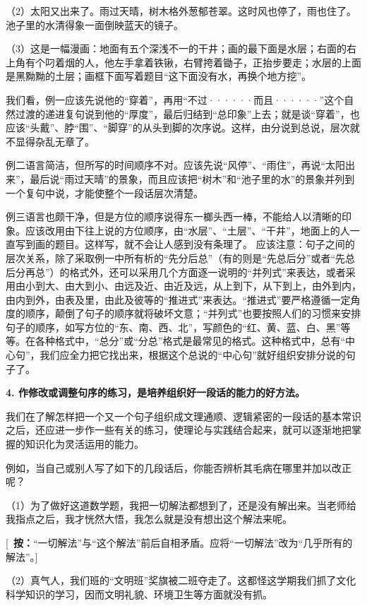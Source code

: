 （2）太阳又出来了。雨过天晴，树木格外葱郁苍翠。这时风也停了，雨也住了。池子里的水清得象一面倒映蓝天的镜子。

（3）这是一幅漫画：地面有五个深浅不一的干井；画的最下面是水层；右面的右上角有个叼着烟的人，他左手拿着铁锹，右臂挎着锄子，正抬步要走；水层的上面是黑黝黝的土层；画框下面写着题目“这下面没有水，再换个地方挖”。

我们看，例一应该先说他的“穿着”，再用“不过······而且······”这个自然过渡的递进复句说到他的“厚度”，最后归结到“总印象”上去；就是谈“穿着”，也应该“头戴”、脖“围”、“脚穿”的从头到脚的次序说。这样，由分说到总说，层次就不显得杂乱无章了。

例二语言简洁，但所写的时间顺序不对。应该先说“风停”、“雨住”，再说“太阳出来”，最后说“雨过天晴”的景象，而且应该把“树木”和“池子里的水”的景象并列到一个复句中说，才能使整个一段话层次清楚。

例三语言也颇干净，但是方位的顺序说得东一榔头西一棒，不能给人以清晰的印象。应该改用由下往上说的方位顺序，由“水层”、“土层”、“干井”，地面上的人一直写到画的题目。这样写，就不会让人感到没有条理了。
应该注意：句子之间的层次关系，除了采取例一中所有析的“先分后总”（有的则是“先总后分”或者“先总后分再总”）的格式外，还可以采用几个方面逐一说明的“并列式”来表达，或者采用由小到大、由大到小、由远及近、由近及远，从上到下，从下到上，由外到内，由内到外，由表及里，由此及彼等的“推进式”来表达。“推进式”要严格遵循一定角度的顺序，颠倒了句子的顺序就将破坏文意；“并列式”也要按照人们的习惯来安排句子的顺序，如写方位的“东、南、西、北”，写颜色的“红、黄、蓝、白、黑”等等。在各种格式中，“总分”或“分总”格式是最常见的格式。这种格式中，总有“中心句”，我们应全力把它找出来，根据这个总说的“中心句”就好组织安排分说的句子了。

\textbf{4. 作修改或调整句序的练习，是培养组织好一段话的能力的好方法。}

我们在了解怎样把一个又一个句子组织成文理通顺、逻辑紧密的一段话的基本常识之后，还应进一步作一些有关的练习，使理论与实践结合起来，就可以逐渐地把掌握的知识化为灵活运用的能力。

例如，当自己或别人写了如下的几段话后，你能否辨析其毛病在哪里并加以改正呢？

（1）为了做好这道数学题，我把一切解法都想到了，还是没有解出来。当老师给我指点之后，我才恍然大悟，我怎么就是没有想出这个解法来呢。

[\ \textbf{按：}“一切解法”与“这个解法”前后自相矛盾。应将“一切解法”改为“几乎所有的解法”。]

（2）真气人，我们班的“文明班”奖旗被二班夺走了。这都怪这学期我们抓了文化科学知识的学习，因而文明礼貌、环境卫生等方面就没有抓。

